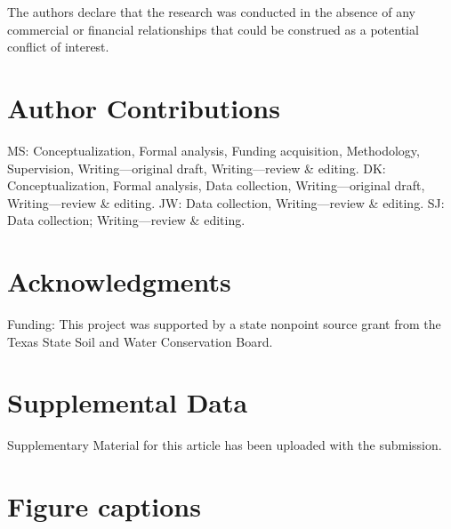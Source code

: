 \documentclass[utf8]{FrontiersinHarvard}
\begin{document}
The authors declare that the research was conducted in the absence of any
commercial or financial relationships that could be construed as a potential
conflict of interest.

\hypertarget{author-contributions}{%
\section*{Author Contributions}\label{author-contributions}}

MS: Conceptualization, Formal analysis, Funding acquisition, Methodology, Supervision, Writing---original draft, Writing---review \& editing.
DK: Conceptualization, Formal analysis, Data collection, Writing---original draft, Writing---review \& editing.
JW: Data collection, Writing---review \& editing.
SJ: Data collection; Writing---review \& editing.

\hypertarget{acknowledgments}{%
\section*{Acknowledgments}\label{acknowledgments}}

Funding: This project was supported by a state nonpoint source grant from the Texas State Soil and Water Conservation Board.

\hypertarget{supplemental-data}{%
\section*{Supplemental Data}\label{supplemental-data}}

Supplementary Material for this article has been uploaded with the submission.




\hypertarget{figure-captions}{%
\section*{Figure captions}\label{figure-captions}}
\end{document}

